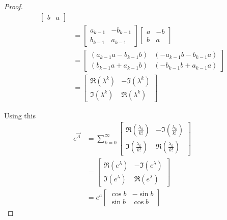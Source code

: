 \begin{proof}
\begin{align*}
\begin{bmatrix}
			b & a
		\end{bmatrix} \\
		&= 
		\begin{bmatrix}
			a_{k - 1} & -b_{k - 1} \\
			b_{k - 1} & a_{k - 1}
		\end{bmatrix}
		\begin{bmatrix}
			a & -b \\
			b & a
		\end{bmatrix} \\
		&=
		\begin{bmatrix}
			(a_{k - 1}a - b_{k - 1}b) & (-a_{k - 1}b - b_{k - 1}a) \\
			(b_{k - 1}a + a_{k - 1}b) & (-b_{k - 1}b + a_{k - 1}a)
		\end{bmatrix} \\
		&=
		\begin{bmatrix}
			\Re(\lambda^k)	& -\Im(\lambda^k) \\
			\Im(\lambda^k)	& \Re(\lambda^k)
		\end{bmatrix}
	\end{align*}

	Using this
	\begin{align*}
		e^{\vec A}
		&=
		\sum_{k = 0}^\infty
		\begin{bmatrix}
			\Re(\frac{\lambda_k}{k!})	& -\Im(\frac{\lambda_k}{k!}) \\
			\Im(\frac{\lambda_k}{k!})	& \Re(\frac{\lambda_k}{k!})
		\end{bmatrix} \\
		&=
		\begin{bmatrix}
			\Re(e^\lambda)	& -\Im(e^\lambda) \\
			\Im(e^\lambda)	& \Re(e^\lambda)
		\end{bmatrix} \\
		&=
		e^a
		\begin{bmatrix}
			\cos b 	& -\sin b \\
			\sin b 	& \cos b
		\end{bmatrix}
	\end{align*}
\end{proof}

